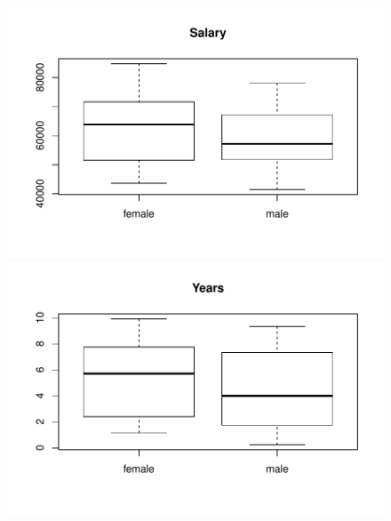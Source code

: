 \documentclass[addpoints,12pt]{exam}
\begin{document}
\begin{questions}
\newpage
\begin{figure}[h]
  \centering
  \includegraphics[scale=0.75]{final_May_2017_boxplot_salary}\\
  \vspace{1em}
  \includegraphics[scale=0.75]{final_May_2017_boxplot_years}\\
\end{figure}

\end{questions}
\end{document}
